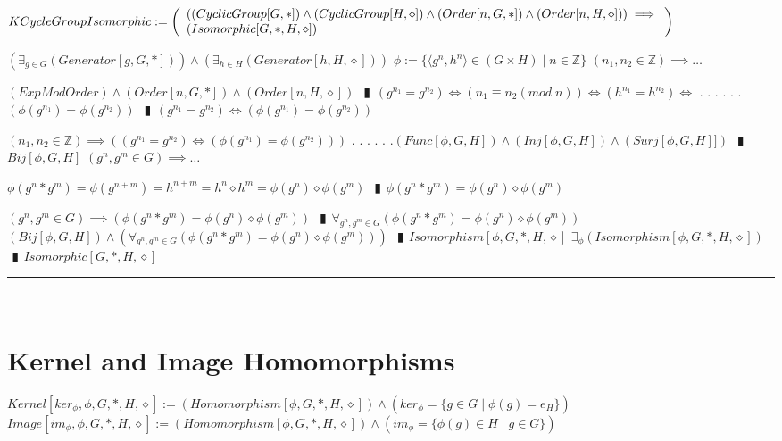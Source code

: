 \documentclass{book}
\newcommand{\abr}{:=}
\newcommand{\cont}{\phantom{.}. . .\phantom{.}}
\newcommand{\pipe}{$\phantom{(}\vrectangleblack\phantom{)}$}
\newcommand{\pr}[1]{\left(#1\right)}
\newcommand{\st}{\mathbin{|}}
\begin{document}
$KCycleGroupIsomorphic \abr \left(\begin{array}{ll}
  \pr{(CyclicGroup[G, *]) \hfill \land \hfill (CyclicGroup[H, \diamond]) \hfill \land \hfill (Order[n, G, *]) \hfill \land \hfill (Order[n, H, \diamond])} \hfill \implies \hfill \\
  (Isomorphic[G, *, H, \diamond])
\end{array}\right)$
\begin{enumerate}
  \lit $\pr{\exists_{g \in G}(Generator[g, G, *])} \land \pr{\exists_{h \in H}(Generator[h, H, \diamond])}$
  \lit $\phi \abr \{\langle g^n, h^n \rangle \in (G \times H) \st n \in \mathbb{Z}\}$
  \lit $(n_1, n_2 \in \mathbb{Z}) \implies \ldots$
  \begin{enumerate}
    \lit $(ExpModOrder) \land (Order[n, G, *]) \land (Order[n, H, \diamond])$ \pipe $(g^{n_1} = g^{n_2}) \iff \pr{n_1 \equiv n_2 (mod \phantom{.} n)} \iff (h^{n_1} = h^{n_2}) \iff$ \cont
    \lit \cont $\pr{\phi(g^{n_1}) = \phi(g^{n_2})}$ \pipe $(g^{n_1} = g^{n_2}) \iff \pr{\phi(g^{n_1}) = \phi(g^{n_2})}$
  \end{enumerate}
  \lit $(n_1, n_2 \in \mathbb{Z}) \implies \pr{(g^{n_1} = g^{n_2}) \iff \pr{\phi(g^{n_1}) = \phi(g^{n_2})}}$ \cont
  \lit \cont $(Func[\phi, G, H]) \land (Inj[\phi, G, H]) \land (Surj[\phi, G, H]])$ \pipe $Bij[\phi, G, H]$ %
  \lit $(g^n, g^m \in G) \implies \ldots$
  \begin{enumerate}
    \lit $\phi(g^n * g^m) = \phi(g^{n + m}) = h^{n + m} = h^n \diamond h^m = \phi(g^n) \diamond \phi(g^m)$ \pipe $\phi(g^n * g^m) = \phi(g^n) \diamond \phi(g^m)$
  \end{enumerate}
  \lit $(g^n, g^m \in G) \implies \pr{\phi(g^n * g^m) = \phi(g^n) \diamond \phi(g^m)}$ \pipe $\forall_{g^n, g^m \in G}\pr{\phi(g^n * g^m) = \phi(g^n) \diamond \phi(g^m)}$
  \lit $(Bij[\phi, G, H]) \land \pr{\forall_{g^n, g^m \in G}\pr{\phi(g^n * g^m) = \phi(g^n) \diamond \phi(g^m)}}$ \pipe $Isomorphism[\phi, G, *, H, \diamond]$
  \lit $\exists_{\phi}(Isomorphism[\phi, G, *, H, \diamond])$ \pipe $Isomorphic[G, *, H, \diamond]$
\end{enumerate} \vspace{.75mm} \hrule \vspace{.75mm} \ \\

\section{Kernel and Image Homomorphisms}
$Kernel[ker_\phi, \phi, G, *, H, \diamond] \abr (Homomorphism[\phi, G, *, H, \diamond]) \land \pr{ker_\phi = \{g \in G \st \phi(g) = e_H\}}$ \\
$Image[im_\phi, \phi, G, *, H, \diamond] \abr (Homomorphism[\phi, G, *, H, \diamond]) \land \pr{im_\phi = \{\phi(g) \in H \st g \in G\}}$ \\
\end{document}
